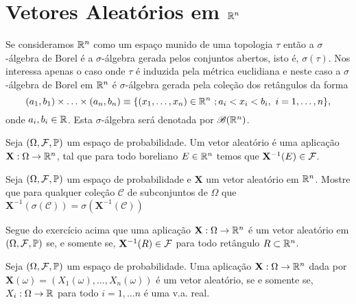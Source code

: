 \section{Vetores Aleatórios em $\mathbb{R}^n$}

Se consideramos $\mathbb{R}^n$ como um espaço munido de uma 
topologia $\tau$ então a $\sigma$-álgebra de Borel 
é a $\sigma$-álgebra gerada pelos conjuntos abertos,
isto é, $\sigma(\tau)$.
Nos interessa apenas o caso onde $\tau$ é induzida 
pela métrica euclidiana e neste caso a 
$\sigma$-álgebra de Borel em $\mathbb{R}^n$ é 
$\sigma$-álgebra gerada pela coleção 
dos retângulos da forma 
	\[
		(a_1,b_1) \times\ldots\times (a_n,b_n)
		\equiv
		\{
		(x_1,\ldots,x_n)\in\mathbb{R}^n\ ; a_i<x_i<b_i,\ i=1,\ldots,n
		\},
	\]
onde $a_i,b_i\in \mathbb{R}$. Esta $\sigma$-álgebra será denotada
por $\mathscr{B}(\mathbb{R}^n)$.



\begin{definicao}
	Seja $(\Omega,\mathcal{F},\mathbb{P})$ um espaço de probabilidade.
	Um vetor aleatório é uma aplicação $\mathbf{X}:\Omega\to\mathbb{R}^n$,
	tal que para todo boreliano $E\in \mathbb{R}^n$ temos que 
	$\mathbf{X}^{-1}(E)\in \mathcal{F}$.
\end{definicao}


\begin{exercicio}
Seja $(\Omega,\mathcal{F},\mathbb{P})$ um espaço de probabilidade e 
$\mathbf{X}$ um vetor aleatório em $\mathbb{R}^n$.  
Mostre que para qualquer coleção 
$\mathcal{C}$ de subconjuntos de $\Omega$ que 
$
\mathbf{X}^{-1}(\sigma(\mathcal{C}))
=
\sigma(\mathbf{X}^{-1}(\mathcal{C}))
$
\end{exercicio}


Segue do exercício acima que uma
aplicação $\mathbf{X}:\Omega\to\mathbb{R}^n$ é um vetor aleatório
em $(\Omega,\mathcal{F},\mathbb{P})$ se, e somente se, 
$\mathbf{X}^{-1}(R)\in \mathcal{F}$ para todo retângulo $R\subset \mathbb{R}^n$.   



\begin{proposicao}\label{prop-caracterizacao-vetor-aleatorio}
Seja $(\Omega,\mathcal{F},\mathbb{P})$ um espaço de probabilidade.
Uma aplicação $\mathbf{X}:\Omega\to\mathbb{R}^n$ 
dada por $\mathbf{X}(\omega)=(X_1(\omega),\ldots,X_n(\omega))$
é um vetor aleatório, se e somente se, $X_i:\Omega\to\mathbb{R}$ 
para todo $i=1,\ldots n$ é uma v.a. real.
\end{proposicao}


